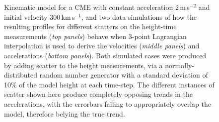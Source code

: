 \documentclass[structabstract]{aa}
\begin{document}
\begin{figure}[!t]
\caption{Kinematic model for a CME with constant acceleration $2$\,m\,s$^{-2}$ and initial velocity $300$\,km\,s$^{-1}$, and two data simulations of how the resulting profiles for different scatters on the height-time measurements (\emph{top panels}) behave when 3-point Lagrangian interpolation is used to derive the velocities (\emph{middle panels}) and accelerations (\emph{bottom panels}). Both simulated cases were produced by adding scatter to the height measurements, via a normally-distributed random number generator with a standard deviation of 10\% of the model height at each time-step. The different instances of scatter shown here produce completely opposing trends in the accelerations, with the errorbars failing to appropriately overlap the model, therefore belying the true trend.}
\label{sim_vels_thesis}
\end{figure}
 
\end{document}
